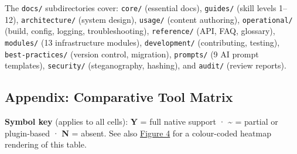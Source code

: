 \documentclass[
]{article}
\begin{document}
The \texttt{docs/} subdirectories cover: \texttt{core/} (essential
docs), \texttt{guides/} (skill levels 1--12), \texttt{architecture/}
(system design), \texttt{usage/} (content authoring),
\texttt{operational/} (build, config, logging, troubleshooting),
\texttt{reference/} (API, FAQ, glossary), \texttt{modules/} (13
infrastructure modules), \texttt{development/} (contributing, testing),
\texttt{best-practices/} (version control, migration), \texttt{prompts/}
(9 AI prompt templates), \texttt{security/} (steganography, hashing),
and \texttt{audit/} (review reports).

\newpage

\newpage

\subsection{Appendix: Comparative Tool Matrix}\label{appendix-matrix}

\textbf{Symbol key} (applies to all cells): \textbf{Y} = full native
support · \textbf{\textasciitilde{}} = partial or plugin-based ·
\textbf{N} = absent. See also
\href{04_results.md\#comparative-feature-analysis}{Figure 4} for a
colour-coded heatmap rendering of this table.

\begin{table}[h]
\caption{Comparative feature matrix (14 capabilities $\times$ 10 tools). Y~=~full native support, \textasciitilde~=~partial or plugin-based, N~=~absent.}
\label{tab:comparative-matrix}
\end{table}
\end{document}
